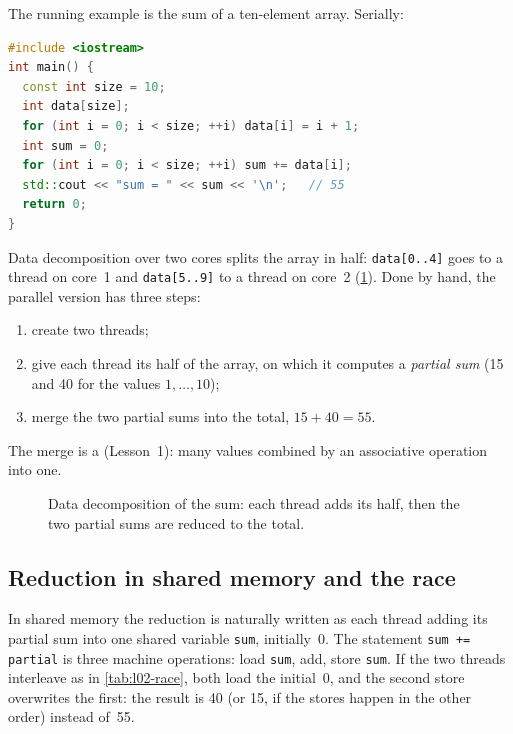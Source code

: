 \documentclass[../main.tex]{subfiles}
\begin{document}
The running example is the sum of a ten-element array.  Serially:
\begin{lstlisting}[language=C++, numbers=none]
#include <iostream>
int main() {
  const int size = 10;
  int data[size];
  for (int i = 0; i < size; ++i) data[i] = i + 1;
  int sum = 0;
  for (int i = 0; i < size; ++i) sum += data[i];
  std::cout << "sum = " << sum << '\n';   // 55
  return 0;
}
\end{lstlisting}
Data decomposition over two cores splits the array in half:
\texttt{data[0..4]} goes to a thread on core~1 and \texttt{data[5..9]} to a
thread on core~2 (\cref{fig:l02-data-decomposition}).  Done by hand, the
parallel version has three steps:
\begin{enumerate}
  \item create two threads;
  \item give each thread its half of the array, on which it computes a
    \emph{partial sum} (15 and 40 for the values $1,\ldots,10$);
  \item merge the two partial sums into the total, $15+40=55$.
\end{enumerate}
The merge is a  (Lesson~1): many values combined by an
associative operation into one.

\begin{figure}[tb]
  \centering
  
  \caption{Data decomposition of the sum: each thread adds its half, then
    the two partial sums are reduced to the total.}
  \label{fig:l02-data-decomposition}
\end{figure}

\subsection{Reduction in shared memory and the race}

In shared memory the reduction is naturally written as each thread adding
its partial sum into one shared variable \texttt{sum}, initially~0.  The
statement \texttt{sum += partial} is three machine operations: load
\texttt{sum}, add, store \texttt{sum}.  If the two threads interleave as in
\cref{tab:l02-race}, both load the initial~0, and the second store
overwrites the first: the result is 40 (or 15, if the stores happen in the
other order) instead of~55.
\end{document}
